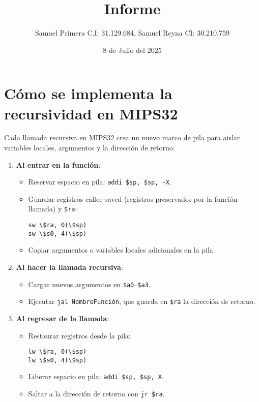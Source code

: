 \documentclass{article}
\title{Informe}
\author{Samuel Primera C.I: 31.129.684, Samuel Reyna CI: 30.210.759}
\date{8 de Julio del 2025}
\begin{document}
\maketitle

\section{Cómo se implementa la recursividad en MIPS32}
Cada llamada recursiva en MIPS32 crea un nuevo marco de pila para aislar variables locales, argumentos y la dirección de retorno:

\begin{enumerate}
  \item \textbf{Al entrar en la función}:
    \begin{itemize}
      \item Reservar espacio en pila: \texttt{addi \$sp, \$sp, -X}.
      \item Guardar registros callee-saved (registros preservados por la función llamada) y \texttt{\$ra}:
        \begin{verbatim}
sw \$ra, 0(\$sp)
sw \$s0, 4(\$sp)
        \end{verbatim}
      \item Copiar argumentos o variables locales adicionales en la pila.
    \end{itemize}

  \item \textbf{Al hacer la llamada recursiva}:
    \begin{itemize}
      \item Cargar nuevos argumentos en \texttt{\$a0}--\texttt{\$a3}.
      \item Ejecutar \texttt{jal NombreFunción}, que guarda en \texttt{\$ra} la dirección de retorno.
    \end{itemize}

  \item \textbf{Al regresar de la llamada}:
    \begin{itemize}
      \item Restaurar registros desde la pila:
        \begin{verbatim}
lw \$ra, 0(\$sp)
lw \$s0, 4(\$sp)
        \end{verbatim}
      \item Liberar espacio en pila: \texttt{addi \$sp, \$sp, X}.
      \item Saltar a la dirección de retorno con \texttt{jr \$ra}.
    \end{itemize}
\end{enumerate}
\end{document}
